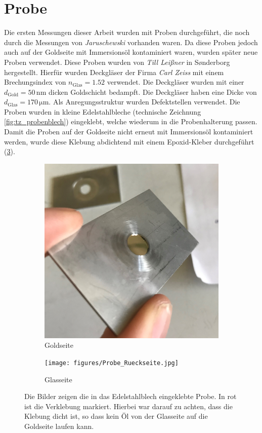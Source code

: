 \documentclass[a4paper, titlepage,  ngerman]{book}
\begin{document}
	\section{Probe}
	Die ersten Messungen dieser Arbeit wurden mit Proben durchgeführt, die noch durch die Messungen von \textit{Jaruschewski} \cite{Jaruschewski.2020} vorhanden waren. Da diese Proben jedoch auch auf der Goldseite mit Immersionsöl kontaminiert waren, wurden später neue Proben verwendet. Diese Proben wurden von \textit{Till Leißner} in S\o nderborg hergestellt. Hierfür wurden Deckgläser der Firma \textit{Carl Zeiss} mit einem Brechungsindex von $n_{\mathrm{Glas}}= 1.52$ verwendet. Die Deckgläser wurden mit einer $d_{\mathrm{Gold}} = 50\,\mathrm{nm}$ dicken Goldschicht bedampft. Die Deckgläser haben eine Dicke von $d_{\mathrm{Glas}} = 170\,\mathrm{\mu m}$. Als Anregungsstruktur wurden Defektstellen verwendet. Die Proben wurden in kleine Edelstahlbleche (technische Zeichnung \ref{fig:tz_probenblech}) eingeklebt, welche wiederum in die Probenhalterung passen. Damit die Proben auf der Goldseite nicht erneut mit Immersionsöl kontaminiert werden, wurde diese Klebung abdichtend mit einem Epoxid-Kleber durchgeführt (\ref{fig:probe}).
	\begin{figure}
		\centering
		\begin{subfigure}{0.4\textwidth}
			\centering
			\includegraphics[width=\textwidth]{figures/Probe_Vorderseite.jpg}
			\caption{Goldseite}
			\label{fig:probe_vorderseite}
		\end{subfigure}
		\hfill
		\begin{subfigure}{0.4\textwidth}
			\centering
			\texttt{[image: figures/Probe\_Rueckseite.jpg]}
			\caption{Glasseite}
			\label{fig:probe_rueckseite}
		\end{subfigure}
		\caption[Eingeklebte Probe]{Die Bilder zeigen die in das Edelstahlblech eingeklebte Probe. In rot ist die Verklebung markiert. Hierbei war darauf zu achten, dass die Klebung dicht ist, so dass kein Öl von der Glasseite auf die Goldseite laufen kann.}
		\label{fig:probe}
	\end{figure}
\end{document}
